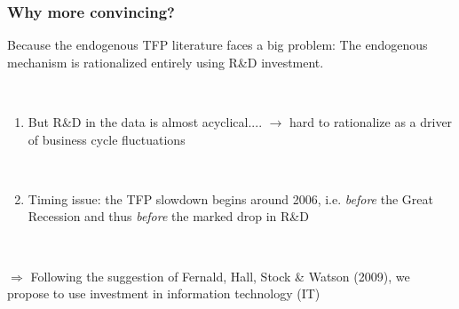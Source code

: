 \documentclass{beamer}
\begin{document}
\begin{frame}
	\frametitle{Why more convincing?}
	\label{convincing}
	
	Because the endogenous TFP literature faces a big problem: The endogenous mechanism is rationalized entirely using R\&D investment. 
	
	\
	
\begin{enumerate}
\item  But R\&D in the data is almost acyclical.... $\rightarrow$ hard to rationalize as a driver of business cycle fluctuations %
 \hyperlink{growth_rates}{}

\

\item Timing issue: the TFP slowdown begins around 2006, i.e. \emph{before} the Great Recession and thus \emph{before} the marked drop in R\&D  %
\hyperlink{timing}{}

\end{enumerate}

\

$\Rightarrow$ Following the suggestion of Fernald, Hall, Stock \& Watson (2009), we propose to use investment in information technology (IT)  %
\hyperlink{it_investment}{}

	
	
\end{frame}
\end{document}
